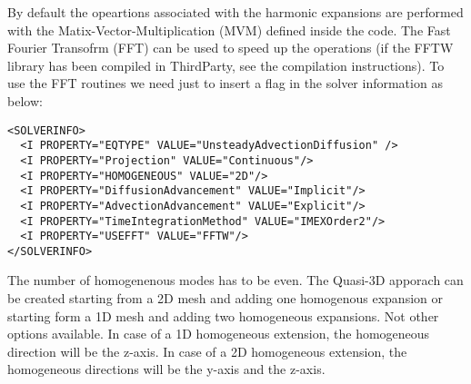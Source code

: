 By default the opeartions associated with the harmonic expansions are performed with the Matix-Vector-Multiplication (MVM) defined inside the code. The Fast Fourier Transofrm (FFT) can be used to speed up the operations (if the FFTW library has been compiled in ThirdParty, see the compilation instructions). To use the FFT routines we need just to insert a flag in the solver information as below:
\begin{lstlisting}[style=XMLStyle]
<SOLVERINFO>
  <I PROPERTY="EQTYPE" VALUE="UnsteadyAdvectionDiffusion" />
  <I PROPERTY="Projection" VALUE="Continuous"/>
  <I PROPERTY="HOMOGENEOUS" VALUE="2D"/>
  <I PROPERTY="DiffusionAdvancement" VALUE="Implicit"/>
  <I PROPERTY="AdvectionAdvancement" VALUE="Explicit"/>
  <I PROPERTY="TimeIntegrationMethod" VALUE="IMEXOrder2"/>
  <I PROPERTY="USEFFT" VALUE="FFTW"/>
</SOLVERINFO>
\end{lstlisting}
The number of homogenenous modes has to be even. The Quasi-3D apporach can be created starting from a 2D mesh and adding one homogenous expansion or starting form a 1D mesh and adding two homogeneous expansions. Not other options available. In case of a 1D homogeneous extension, the homogeneous direction will be the z-axis. In case of a 2D homogeneous extension, the homogeneous directions will be the y-axis and the z-axis.

